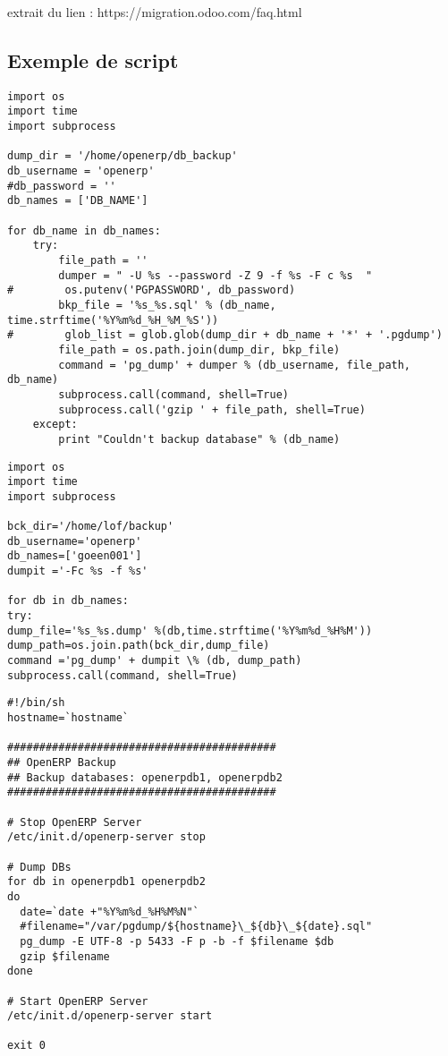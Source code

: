 \documentclass[12pt,a4paper]{article}
\begin{document}
extrait du lien : https://migration.odoo.com/faq.html


\subsection{Exemple de script}
\label{sec:script}

\begin{verbatim}
import os
import time
import subprocess

dump_dir = '/home/openerp/db_backup'
db_username = 'openerp'
#db_password = ''
db_names = ['DB_NAME']

for db_name in db_names:
    try:
        file_path = ''
        dumper = " -U %s --password -Z 9 -f %s -F c %s  "
#        os.putenv('PGPASSWORD', db_password)
        bkp_file = '%s_%s.sql' % (db_name, time.strftime('%Y%m%d_%H_%M_%S'))
#        glob_list = glob.glob(dump_dir + db_name + '*' + '.pgdump')
        file_path = os.path.join(dump_dir, bkp_file)
        command = 'pg_dump' + dumper % (db_username, file_path, db_name)
        subprocess.call(command, shell=True)
        subprocess.call('gzip ' + file_path, shell=True)
    except:
        print "Couldn't backup database" % (db_name)
\end{verbatim}

\begin{verbatim}
import os
import time
import subprocess

bck_dir='/home/lof/backup'
db_username='openerp'
db_names=['goeen001']
dumpit ='-Fc %s -f %s'

for db in db_names:
try:
dump_file='%s_%s.dump' %(db,time.strftime('%Y%m%d_%H%M'))
dump_path=os.join.path(bck_dir,dump_file)
command ='pg_dump' + dumpit \% (db, dump_path)
subprocess.call(command, shell=True)
\end{verbatim} 

\begin{verbatim}
#!/bin/sh    
hostname=`hostname`

##########################################
## OpenERP Backup
## Backup databases: openerpdb1, openerpdb2
##########################################

# Stop OpenERP Server
/etc/init.d/openerp-server stop

# Dump DBs
for db in openerpdb1 openerpdb2
do
  date=`date +"%Y%m%d_%H%M%N"`
  #filename="/var/pgdump/${hostname}\_${db}\_${date}.sql"
  pg_dump -E UTF-8 -p 5433 -F p -b -f $filename $db
  gzip $filename
done

# Start OpenERP Server
/etc/init.d/openerp-server start

exit 0
\end{verbatim} 
\end{document}
